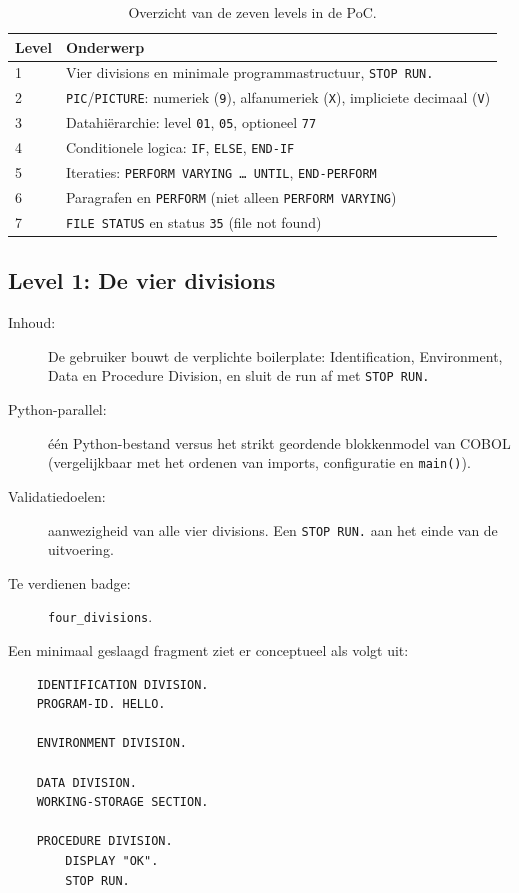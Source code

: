 \begin{table}[H]
\centering
\begin{tabular}{|l|p{8cm}|}
\hline
\textbf{Level} & \textbf{Onderwerp} \\
\hline
1 & Vier divisions en minimale programmastructuur, \texttt{STOP RUN.} \\
2 & \texttt{PIC}/\texttt{PICTURE}: numeriek (\texttt{9}), alfanumeriek (\texttt{X}), impliciete decimaal (\texttt{V}) \\
3 & Datahiërarchie: level \texttt{01}, \texttt{05}, optioneel \texttt{77} \\
4 & Conditionele logica: \texttt{IF}, \texttt{ELSE}, \texttt{END-IF} \\
5 & Iteraties: \texttt{PERFORM VARYING \ldots\ UNTIL}, \texttt{END-PERFORM} \\
6 & Paragrafen en \texttt{PERFORM} (niet alleen \texttt{PERFORM VARYING}) \\
7 & \texttt{FILE STATUS} en status \texttt{35} (file not found) \\
\hline
\end{tabular}
\caption{Overzicht van de zeven levels in de PoC.}
\label{tab:poc-levels}
\end{table}

\subsection{Level 1: De vier divisions}
\label{subsec:poc-level-1}

\begin{description}
    \item[Inhoud:] De gebruiker bouwt de verplichte boilerplate: Identification, Environment, Data en Procedure Division, en sluit de run af met \texttt{STOP RUN.}
    \item[Python-parallel:] één Python-bestand versus het strikt geordende blokkenmodel van COBOL (vergelijkbaar met het ordenen van imports, configuratie en \texttt{main()}).
    \item[Validatiedoelen:] aanwezigheid van alle vier divisions. Een \texttt{STOP RUN.} aan het einde van de uitvoering.
    \item[Te verdienen badge:] \texttt{four\_divisions}.
\end{description}

Een minimaal geslaagd fragment ziet er conceptueel als volgt uit:

\begin{listing}[H]
  \begin{verbatim}
    IDENTIFICATION DIVISION.
    PROGRAM-ID. HELLO.

    ENVIRONMENT DIVISION.

    DATA DIVISION.
    WORKING-STORAGE SECTION.

    PROCEDURE DIVISION.
        DISPLAY "OK".
        STOP RUN.
  \end{verbatim}
  \caption[Geslaagd fragment Level 1]{Geslaagd fragment Level 1.}
  \label{lst:cobol_level1}
\end{listing}

